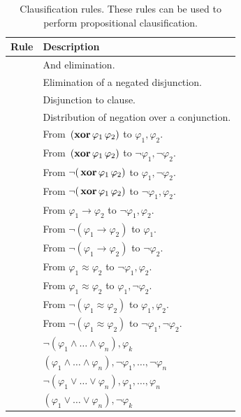 \begin{xltabular}{\linewidth}{l X}
\caption{Clausification rules.  These rules can be used to perform propositional
clausification.}
\label{rule-tab:clausification}\\
  Rule & Description \\
  \hline
{} & And elimination. \\
 & Elimination of a negated disjunction. \\
 & Disjunction to clause. \\
 & Distribution of negation over a conjunction. \\
 & From $\,(\mathbf{xor}\, \varphi_1\, \varphi_2)$ to $\varphi_1, \varphi_2$. \\
 & From $\,(\mathbf{xor}\, \varphi_1\, \varphi_2)$ to $\neg\varphi_1, \neg\varphi_2$. \\
 & From $\neg(\,\mathbf{xor}\, \varphi_1\, \varphi_2)$ to $\varphi_1, \neg\varphi_2$. \\
 & From $\neg(\,\mathbf{xor}\, \varphi_1\, \varphi_2)$ to $\neg\varphi_1, \varphi_2$. \\
 & From $ \varphi_1\rightarrow\varphi_2 $ to $\neg\varphi_1 , \varphi_2 $. \\
 & From $\neg (\varphi_1\rightarrow\varphi_2)$ to $\varphi_1$. \\
 & From $\neg (\varphi_1\rightarrow\varphi_2)$ to $\neg\varphi_2$. \\
 & From $ \varphi_1≈\varphi_2$ to $\neg\varphi_1 , \varphi_2$. \\
 & From $ \varphi_1≈\varphi_2$ to $\varphi_1 , \neg\varphi_2$. \\
 & From $\neg(\varphi_1≈\varphi_2)$ to $\varphi_1 , \varphi_2$. \\
 & From $\neg(\varphi_1≈\varphi_2)$ to $\neg\varphi_1 , \neg\varphi_2$. \\
 & $\neg (\varphi_1 \land \dots \land \varphi_n), \varphi_k$\\
 & $(\varphi_1 \land \dots \land \varphi_n), \neg\varphi_1, \dots , \neg\varphi_n $ \\
 & $\neg (\varphi_1 \lor \dots \lor \varphi_n) , \varphi_1 , \dots
  , \varphi_n $ \\
 &
$ (\varphi_1 \lor \dots \lor \varphi_n) , \neg \varphi_k $\\

\end{xltabular}
